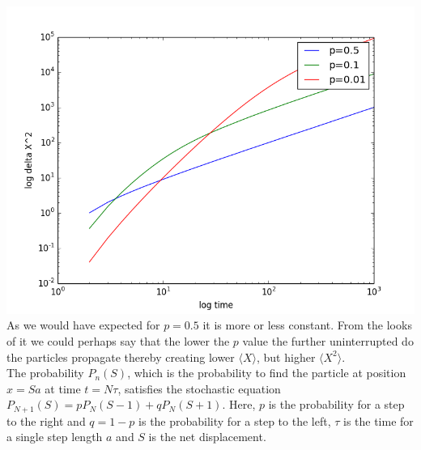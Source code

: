 \documentclass{article}
\begin{document}
\begin{enumerate}[I]
\includegraphics[scale=0.3]{alog.png}\\
As we would have expected for $p=0.5$ it is more or less constant. From the looks of it we could perhaps say that the lower the $p$ value the further uninterrupted do the particles propagate thereby creating lower $\langle X \rangle$, but higher $\langle X^2 \rangle$.\\

The probability $P_n(S)$, which is the probability to find the particle at position $x=Sa$ at time $t=N\tau$, satisfies the stochastic equation $P_{N+1}(S) = pP_N(S-1) + qP_N(S+1)$. Here, $p$ is the probability for a step to the right and $q=1-p$ is the probability for a step to the left, $\tau$ is the time for a single step length $a$ and $S$ is the net displacement.


\end{enumerate}
\end{document}
